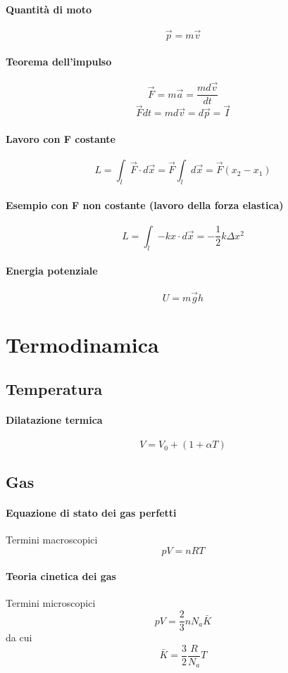 \documentclass[12pt]{article}
\begin{document}
            \paragraph*{Quantità di moto}
            \[\vec{p} = m\vec{v}\]
            \paragraph*{Teorema dell'impulso}
            \[\vec{F} = m \vec{a} = \frac{md\vec{v}}{dt}\]
            \[\vec{F}dt = md\vec{v} = d\vec{p} = \vec{I}\]
            \paragraph*{Lavoro con F costante}
            \[L = \int_{l}{\vec{F} \cdot d \vec{x}} = \vec{F}\int_{l}{ d \vec{x}} = \vec{F}(x_2 - x_1)\]
            \paragraph*{Esempio con F non costante (lavoro della forza elastica)}
            \[L = \int_{l}{-k x \cdot d \vec{x}} = -\frac{1}{2}k\Delta x^2\]
            \paragraph*{Energia potenziale}
            \[U = m\vec{g}h\]
            \newpage
\section{Termodinamica}
    \subsection{Temperatura}
        \paragraph*{Dilatazione termica}
        \[V = V_0 + (1 + \alpha T)\]        
    \subsection{Gas}
        \paragraph*{Equazione di stato dei gas perfetti}
        Termini macroscopici
        \[pV = nRT\]
        \paragraph*{Teoria cinetica dei gas}
        Termini microscopici
        \[pV = \frac{2}{3}n N_a \bar{K}\]
        da cui
        \[\bar{K} = \frac{3}{2}\frac{R}{N_a}T\]
\end{document}
